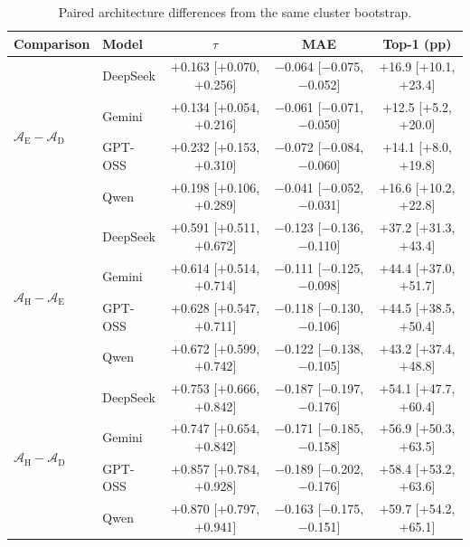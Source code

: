 \documentclass[11pt]{article}
\begin{document}
\begin{table}[htbp]
\centering
\footnotesize
\centering
\setlength{\tabcolsep}{4pt}
\renewcommand{\arraystretch}{1.10}
\caption{Paired architecture differences from the same cluster bootstrap.}
\label{tab:bootstrap_paired}
\begin{tabular}{@{}l l ccc@{}}
\toprule
Comparison & Model & $\tau$ & MAE & Top-1 (pp) \\
\midrule
\multirow{4}{*}{$\mathcal{A}_{\text{E}} - \mathcal{A}_{\text{D}}$}
 & DeepSeek & $+$0.163 [$+$0.070, $+$0.256] & $-$0.064 [$-$0.075, $-$0.052] & $+$16.9 [$+$10.1, $+$23.4] \\
 & Gemini & $+$0.134 [$+$0.054, $+$0.216] & $-$0.061 [$-$0.071, $-$0.050] & $+$12.5 [$+$5.2, $+$20.0] \\
 & GPT-OSS & $+$0.232 [$+$0.153, $+$0.310] & $-$0.072 [$-$0.084, $-$0.060] & $+$14.1 [$+$8.0, $+$19.8] \\
 & Qwen & $+$0.198 [$+$0.106, $+$0.289] & $-$0.041 [$-$0.052, $-$0.031] & $+$16.6 [$+$10.2, $+$22.8] \\
\midrule
\multirow{4}{*}{$\mathcal{A}_{\text{H}} - \mathcal{A}_{\text{E}}$}
 & DeepSeek & $+$0.591 [$+$0.511, $+$0.672] & $-$0.123 [$-$0.136, $-$0.110] & $+$37.2 [$+$31.3, $+$43.4] \\
 & Gemini & $+$0.614 [$+$0.514, $+$0.714] & $-$0.111 [$-$0.125, $-$0.098] & $+$44.4 [$+$37.0, $+$51.7] \\
 & GPT-OSS & $+$0.628 [$+$0.547, $+$0.711] & $-$0.118 [$-$0.130, $-$0.106] & $+$44.5 [$+$38.5, $+$50.4] \\
 & Qwen & $+$0.672 [$+$0.599, $+$0.742] & $-$0.122 [$-$0.138, $-$0.105] & $+$43.2 [$+$37.4, $+$48.8] \\
\midrule
\multirow{4}{*}{$\mathcal{A}_{\text{H}} - \mathcal{A}_{\text{D}}$}
 & DeepSeek & $+$0.753 [$+$0.666, $+$0.842] & $-$0.187 [$-$0.197, $-$0.176] & $+$54.1 [$+$47.7, $+$60.4] \\
 & Gemini & $+$0.747 [$+$0.654, $+$0.842] & $-$0.171 [$-$0.185, $-$0.158] & $+$56.9 [$+$50.3, $+$63.5] \\
 & GPT-OSS & $+$0.857 [$+$0.784, $+$0.928] & $-$0.189 [$-$0.202, $-$0.176] & $+$58.4 [$+$53.2, $+$63.6] \\
 & Qwen & $+$0.870 [$+$0.797, $+$0.941] & $-$0.163 [$-$0.175, $-$0.151] & $+$59.7 [$+$54.2, $+$65.1] \\
\bottomrule
\end{tabular}
\renewcommand{\arraystretch}{1.0}
\end{table}
\end{document}
